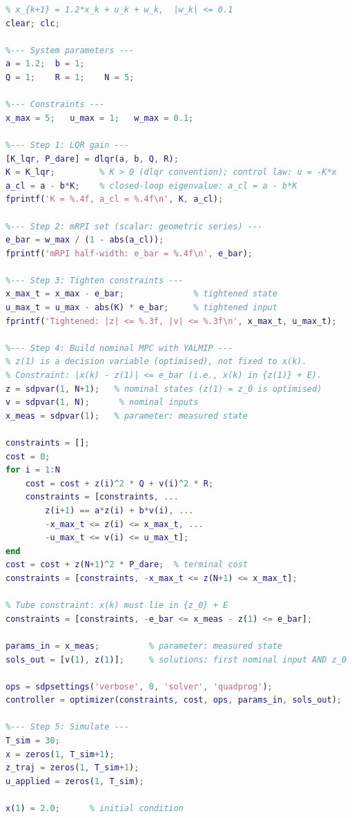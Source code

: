\begin{lstlisting}[language=Matlab, caption={Tube MPC implementation for the scalar system}]
%% Tube MPC: Scalar System
% x_{k+1} = 1.2*x_k + u_k + w_k,  |w_k| <= 0.1
clear; clc;

%--- System parameters ---
a = 1.2;  b = 1;
Q = 1;    R = 1;    N = 5;

%--- Constraints ---
x_max = 5;   u_max = 1;   w_max = 0.1;

%--- Step 1: LQR gain ---
[K_lqr, P_dare] = dlqr(a, b, Q, R);
K = K_lqr;         % K > 0 (dlqr convention); control law: u = -K*x
a_cl = a - b*K;    % closed-loop eigenvalue: a_cl = a - b*K
fprintf('K = %.4f, a_cl = %.4f\n', K, a_cl);

%--- Step 2: mRPI set (scalar: geometric series) ---
e_bar = w_max / (1 - abs(a_cl));
fprintf('mRPI half-width: e_bar = %.4f\n', e_bar);

%--- Step 3: Tighten constraints ---
x_max_t = x_max - e_bar;              % tightened state
u_max_t = u_max - abs(K) * e_bar;     % tightened input
fprintf('Tightened: |z| <= %.3f, |v| <= %.3f\n', x_max_t, u_max_t);

%--- Step 4: Build nominal MPC with YALMIP ---
% z(1) is a decision variable (optimised), not fixed to x(k).
% Constraint: |x(k) - z(1)| <= e_bar (i.e., x(k) in {z(1)} + E).
z = sdpvar(1, N+1);   % nominal states (z(1) = z_0 is optimised)
v = sdpvar(1, N);      % nominal inputs
x_meas = sdpvar(1);   % parameter: measured state

constraints = [];
cost = 0;
for i = 1:N
    cost = cost + z(i)^2 * Q + v(i)^2 * R;
    constraints = [constraints, ...
        z(i+1) == a*z(i) + b*v(i), ...
        -x_max_t <= z(i) <= x_max_t, ...
        -u_max_t <= v(i) <= u_max_t];
end
cost = cost + z(N+1)^2 * P_dare;  % terminal cost
constraints = [constraints, -x_max_t <= z(N+1) <= x_max_t];

% Tube constraint: x(k) must lie in {z_0} + E
constraints = [constraints, -e_bar <= x_meas - z(1) <= e_bar];

params_in = x_meas;          % parameter: measured state
sols_out = [v(1), z(1)];     % solutions: first nominal input AND z_0

ops = sdpsettings('verbose', 0, 'solver', 'quadprog');
controller = optimizer(constraints, cost, ops, params_in, sols_out);

%--- Step 5: Simulate ---
T_sim = 30;
x = zeros(1, T_sim+1);
z_traj = zeros(1, T_sim+1);
u_applied = zeros(1, T_sim);

x(1) = 2.0;      % initial condition


\end{lstlisting}
